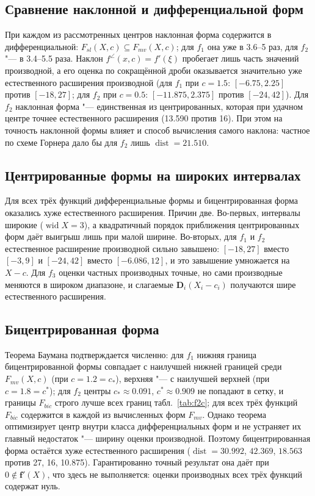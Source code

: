 \documentclass[12pt,a4paper]{article}
\newcommand{\wid}{\operatorname{wid}}
\newcommand{\dist}{\operatorname{dist}}
\newcommand{\bff}{\mathbf{f}}
\begin{document}
\subsection*{Сравнение наклонной и дифференциальной форм}
При каждом из рассмотренных центров наклонная форма содержится в дифференциальной: $F_{sl}(X,c)\subseteq F_{mv}(X,c)$; для $f_1$ она уже в 3.6--5 раз, для $f_2$ "--- в 3.4--5.5 раза. Наклон $f^{\angle}(x,c)=f'(\xi)$ пробегает лишь часть значений производной, а его оценка по сокращённой дроби оказывается значительно уже естественного расширения производной (для $f_1$ при $c=1.5$: $[-6.75,2.25]$ против $[-18,27]$; для $f_2$ при $c=0.5$: $[-11.875,2.375]$ против $[-24,42]$). Для $f_2$ наклонная форма "--- единственная из центрированных, которая при удачном центре точнее естественного расширения (13.590 против 16). При этом на точность наклонной формы влияет и способ вычисления самого наклона: частное по схеме Горнера дало бы для $f_2$ лишь $\dist=21.510$.

\subsection*{Центрированные формы на широких интервалах}
Для всех трёх функций дифференциальные формы и бицентрированная форма оказались хуже естественного расширения. Причин две. Во-первых, интервалы широкие ($\wid X=3$), а квадратичный порядок приближения центрированных форм даёт выигрыш лишь при малой ширине. Во-вторых, для $f_1$ и $f_2$ естественное расширение производной сильно завышено: $[-18,27]$ вместо $[-3,9]$ и $[-24,42]$ вместо $[-6.086,12]$, и это завышение умножается на $X-c$. Для $f_3$ оценки частных производных точные, но сами производные меняются в широком диапазоне, и слагаемые $\mathbf{D}_i(X_i-c_i)$ получаются шире естественного расширения.

\subsection*{Бицентрированная форма}
Теорема Баумана подтверждается численно: для $f_1$ нижняя граница бицентрированной формы совпадает с наилучшей нижней границей среди $F_{mv}(X,c)$ (при $c=1.2=c_{*}$), верхняя "--- с наилучшей верхней (при $c=1.8=c^{*}$); для $f_2$ центры $c_{*}\approx0.091$, $c^{*}\approx0.909$ не попадают в сетку, и границы $F_{bic}$ строго лучше всех границ табл.~\ref{tab:f2c}; для всех трёх функций $F_{bic}$ содержится в каждой из вычисленных форм $F_{mv}$. Однако теорема оптимизирует центр внутри класса дифференциальных форм и не устраняет их главный недостаток "--- ширину оценки производной. Поэтому бицентрированная форма остаётся хуже естественного расширения ($\dist=30.992$, $42.369$, $18.563$ против 27, 16, 10.875). Гарантированно точный результат она даёт при $0\notin\bff'(X)$, что здесь не выполняется: оценки производных всех трёх функций содержат нуль.
\end{document}

